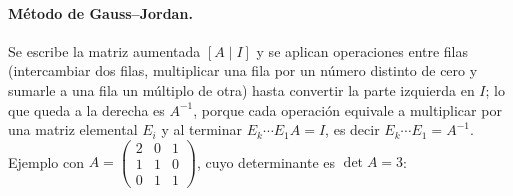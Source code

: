 \paragraph{Método de Gauss--Jordan.} Se escribe la matriz aumentada $[A\mid I]$ y se aplican operaciones
entre filas (intercambiar dos filas, multiplicar una fila por un número distinto de cero y sumarle a una fila
un múltiplo de otra) hasta convertir la parte izquierda en $I$; lo que queda a la derecha es $A^{-1}$,
porque cada operación equivale a multiplicar por una matriz elemental $E_i$ y al terminar
$E_k\cdots E_1A=I$, es decir $E_k\cdots E_1=A^{-1}$. Ejemplo con
$A=\begin{pmatrix} 2 & 0 & 1 \\ 1 & 1 & 0 \\ 0 & 1 & 1 \end{pmatrix}$, cuyo determinante es $\det A=3$:

